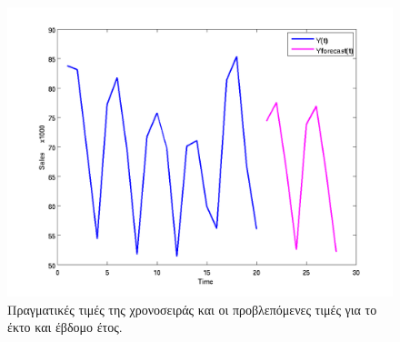 \begin{figure} [ht]
  \centering
  \includegraphics[totalheight=4in,angle=0]{graff7.png}
  \caption{Πραγματικές τιμές της χρονοσειράς και οι προβλεπόμενες τιμές για το έκτο και έβδομο έτος.}
\end{figure}

